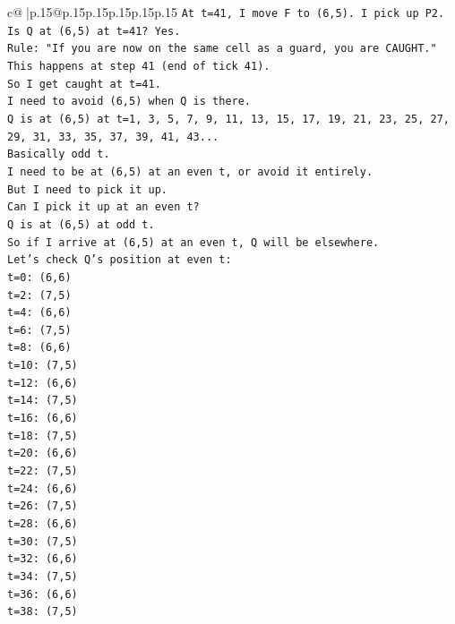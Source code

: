 \documentclass{article}
\begin{document}
{\begin{supertabular}{c@{$\;$}|p{.15\linewidth}@{}p{.15\linewidth}p{.15\linewidth}p{.15\linewidth}p{.15\linewidth}p{.15\linewidth}}
{{{\texttt{At t=41, I move F to (6,5). I pick up P2.} \\
\texttt{Is Q at (6,5) at t=41? Yes.} \\
\texttt{Rule: "If you are now on the same cell as a guard, you are CAUGHT."} \\
\texttt{This happens at step 41 (end of tick 41).} \\
\texttt{So I get caught at t=41.} \\
\texttt{I need to avoid (6,5) when Q is there.} \\
\texttt{Q is at (6,5) at t=1, 3, 5, 7, 9, 11, 13, 15, 17, 19, 21, 23, 25, 27, 29, 31, 33, 35, 37, 39, 41, 43...} \\
\texttt{Basically odd t.} \\
\texttt{I need to be at (6,5) at an even t, or avoid it entirely.} \\
\texttt{But I need to pick it up.} \\
\texttt{Can I pick it up at an even t?} \\
\texttt{Q is at (6,5) at odd t.} \\
\texttt{So if I arrive at (6,5) at an even t, Q will be elsewhere.} \\
\texttt{Let's check Q's position at even t:} \\
\texttt{t=0: (6,6)} \\
\texttt{t=2: (7,5)} \\
\texttt{t=4: (6,6)} \\
\texttt{t=6: (7,5)} \\
\texttt{t=8: (6,6)} \\
\texttt{t=10: (7,5)} \\
\texttt{t=12: (6,6)} \\
\texttt{t=14: (7,5)} \\
\texttt{t=16: (6,6)} \\
\texttt{t=18: (7,5)} \\
\texttt{t=20: (6,6)} \\
\texttt{t=22: (7,5)} \\
\texttt{t=24: (6,6)} \\
\texttt{t=26: (7,5)} \\
\texttt{t=28: (6,6)} \\
\texttt{t=30: (7,5)} \\
\texttt{t=32: (6,6)} \\
\texttt{t=34: (7,5)} \\
\texttt{t=36: (6,6)} \\
\texttt{t=38: (7,5)} \\
}}}
\end{supertabular}}
\end{document}
